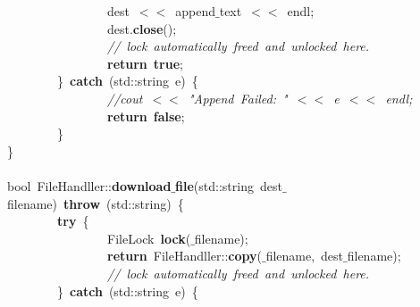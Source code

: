 \mbox{}\ \ \ \ \ \ \ \ \ \ \ \ \ \ \ \ dest\ $<$$<$\ append$\_$text\ $<$$<$\ endl; \\
\mbox{}\ \ \ \ \ \ \ \ \ \ \ \ \ \ \ \ dest.\textbf{close}(); \\
\mbox{}\ \ \ \ \ \ \ \ \ \ \ \ \ \ \ \ \textit{//\ lock\ automatically\ freed\ and\ unlocked\ here.} \\
\mbox{}\ \ \ \ \ \ \ \ \ \ \ \ \ \ \ \ \textbf{return}\ \textbf{true}; \\
\mbox{}\ \ \ \ \ \ \ \ \}\ \textbf{catch}\ (std::string\ e)\ \{ \\
\mbox{}\ \ \ \ \ \ \ \ \ \ \ \ \ \ \ \ \textit{//cout\ $<$$<$\ "{}Append\ Failed:\ "{}\ $<$$<$\ e\ $<$$<$\ endl;} \\
\mbox{}\ \ \ \ \ \ \ \ \ \ \ \ \ \ \ \ \textbf{return}\ \textbf{false}; \\
\mbox{}\ \ \ \ \ \ \ \ \} \\
\mbox{}\} \\
\mbox{} \\
\mbox{}bool\ FileHandller::\textbf{download$\_$file}(std::string\ dest$\_$filename)\ \textbf{throw}\ (std::string)\ \{ \\
\mbox{}\ \ \ \ \ \ \ \ \textbf{try}\ \{ \\
\mbox{}\ \ \ \ \ \ \ \ \ \ \ \ \ \ \ \ FileLock\ \textbf{lock}($\_$filename); \\
\mbox{}\ \ \ \ \ \ \ \ \ \ \ \ \ \ \ \ \textbf{return}\ FileHandller::\textbf{copy}($\_$filename,\ dest$\_$filename); \\
\mbox{}\ \ \ \ \ \ \ \ \ \ \ \ \ \ \ \ \textit{//\ lock\ automatically\ freed\ and\ unlocked\ here.} \\
\mbox{}\ \ \ \ \ \ \ \ \}\ \textbf{catch}\ (std::string\ e)\ \{ \\
